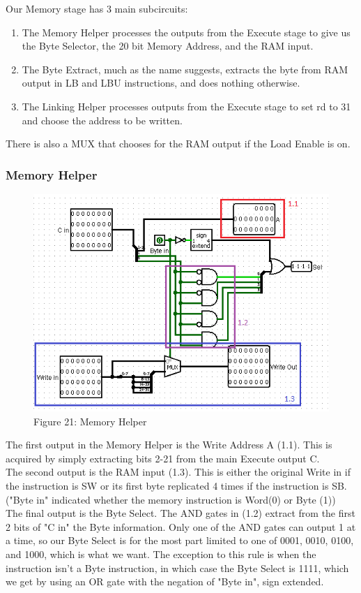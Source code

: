 \documentclass{article}
\begin{document}
Our Memory stage has 3 main subcircuits:
\begin{enumerate}
\item
The Memory Helper processes the outputs from the Execute stage to give us the Byte Selector, the 20 bit Memory Address, and the RAM input. 

\item
The Byte Extract, much as the name suggests, extracts the byte from RAM output in LB and LBU instructions, and does nothing otherwise.

\item
The Linking Helper processes outputs from the Execute stage to set rd to 31 and choose the address to be written.
\end{enumerate} 
There is also a MUX that chooses for the RAM output if the Load Enable is on.
 
\subsubsection{Memory Helper}
\begin{figure}
\vspace{-1.4cm}
\begin{center}
\includegraphics[width=.6\textwidth]{MemHelp.png}\\
Figure 21: Memory Helper 
\end{center}
\vspace{-.5cm}
\end{figure}
The first output in the Memory Helper is the Write Address A (1.1). This is acquired by simply extracting bits 2-21 from the main Execute output C. \\
The second output is the RAM input (1.3). This is either the original Write in if the instruction is SW or its first byte replicated 4 times if the instruction is SB. ("Byte in" indicated whether the memory instruction is Word(0) or Byte (1)) \\
The final output is the Byte Select. The AND gates in (1.2) extract from the first 2 bits of "C in" the Byte information. Only one of the AND gates can output 1 at a time, so our Byte Select is for the most part limited to one of 0001, 0010, 0100, and 1000, which is what we want. The exception to this rule is when the instruction isn't a Byte instruction, in which case the Byte Select is 1111, which we get by using an OR gate with the negation of "Byte in", sign extended. 
\end{document}
